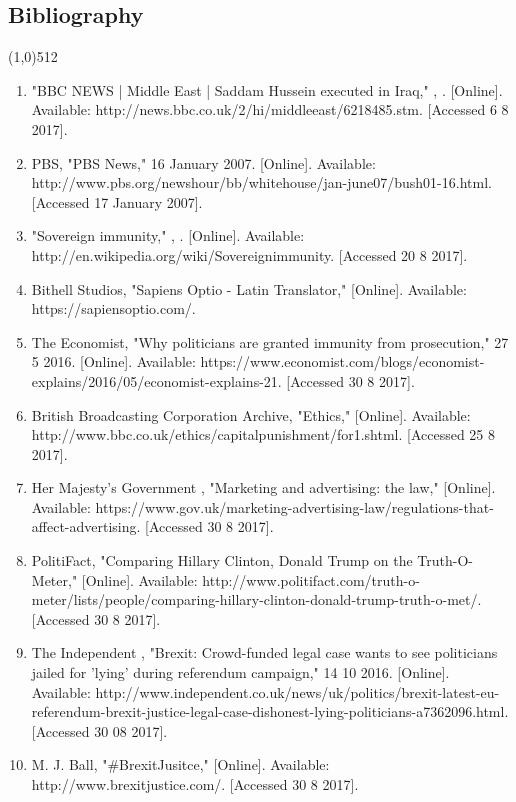 \documentclass[11pt,a4paper]{report}
\let\origsection\subsection
\renewcommand{\subsection}[1]{\origsection{#1}\vspace{-0.5em}\line(1,0){512}\vspace{-1em}}
\begin{document}
	\subsection{Bibliography}
	\begin{flushleft}
		\begin{enumerate}
			\item "BBC NEWS | Middle East | Saddam Hussein executed in Iraq," , . [Online]. Available: http://news.bbc.co.uk/2/hi/middle{\textunderscore}east/6218485.stm. [Accessed 6 8 2017].
			\item PBS, "PBS News," 16 January 2007. [Online]. Available: http://www.pbs.org/newshour/bb/white{\textunderscore}house/jan-june07/bush{\textunderscore}01-16.html. [Accessed 17 January 2007].
			\item "Sovereign immunity," , . [Online]. Available: http://en.wikipedia.org/wiki/Sovereign{\textunderscore}immunity. [Accessed 20 8 2017].
			\item Bithell Studios, "Sapiens Optio - Latin Translator," [Online]. Available: https://sapiensoptio.com/.
			\item The Economist, "Why politicians are granted immunity from prosecution," 27 5 2016. [Online]. Available: https://www.economist.com/blogs/economist-explains/2016/05/economist-explains-21. [Accessed 30 8 2017].
			\item British Broadcasting Corporation Archive, "Ethics," [Online]. Available: http://www.bbc.co.uk/ethics/capitalpunishment/for{\textunderscore}1.shtml. [Accessed 25 8 2017].
			\item Her Majesty's Government , "Marketing and advertising: the law," [Online]. Available: https://www.gov.uk/marketing-advertising-law/regulations-that-affect-advertising. [Accessed 30 8 2017].
			\item PolitiFact, "Comparing Hillary Clinton, Donald Trump on the Truth-O-Meter," [Online]. Available: http://www.politifact.com/truth-o-meter/lists/people/comparing-hillary-clinton-donald-trump-truth-o-met/. [Accessed 30 8 2017].
			\item The Independent , "Brexit: Crowd-funded legal case wants to see politicians jailed for 'lying' during referendum campaign," 14 10 2016. [Online]. Available: http://www.independent.co.uk/news/uk/politics/brexit-latest-eu-referendum-brexit-justice-legal-case-dishonest-lying-politicians-a7362096.html. [Accessed 30 08 2017].
			\item M. J. Ball, "{\#}BrexitJusitce," [Online]. Available: http://www.brexitjustice.com/. [Accessed 30 8 2017].

\end{enumerate}
\end{flushleft}
\end{document}
